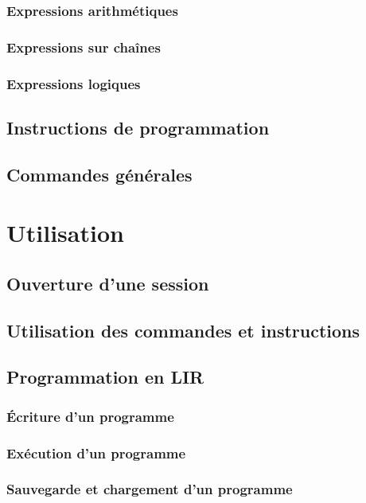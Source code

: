\documentclass[11pt,a4paper,titlepage,openany]{book}
\begin{document}
        \subsection{Expressions arithmétiques}
        \subsection{Expressions sur chaînes}
        \subsection{Expressions logiques}

    \section{Instructions de programmation}

    \section{Commandes générales}

    \chapter{Utilisation}

    \section{Ouverture d'une session}

    \section{Utilisation des commandes et instructions}

    \section{Programmation en LIR}
        \subsection{Écriture d'un programme}
        \subsection{Exécution d'un programme}
        \subsection{Sauvegarde et chargement d'un programme}
\end{document}
